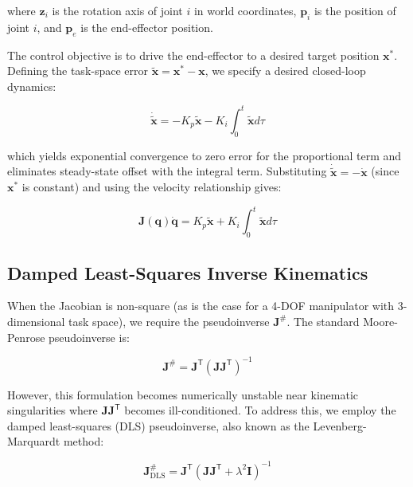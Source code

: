 ﻿\documentclass[12pt,a4paper,oneside]{report}
\begin{document}
where $\mathbf{z}_i$ is the rotation axis of joint $i$ in world coordinates, $\mathbf{p}_i$ is the position of joint $i$, and $\mathbf{p}_e$ is the end-effector position.

The control objective is to drive the end-effector to a desired target position $\mathbf{x}^*$. Defining the task-space error $\tilde{\mathbf{x}} = \mathbf{x}^* - \mathbf{x}$, we specify a desired closed-loop dynamics:

\begin{equation}
\dot{\tilde{\mathbf{x}}} = -K_p \tilde{\mathbf{x}} - K_i \int_0^t \tilde{\mathbf{x}} d\tau
\end{equation}

which yields exponential convergence to zero error for the proportional term and eliminates steady-state offset with the integral term. Substituting $\dot{\tilde{\mathbf{x}}} = -\dot{\mathbf{x}}$ (since $\mathbf{x}^*$ is constant) and using the velocity relationship gives:

\begin{equation}
\mathbf{J}(\mathbf{q}) \dot{\mathbf{q}} = K_p \tilde{\mathbf{x}} + K_i \int_0^t \tilde{\mathbf{x}} d\tau
\end{equation}

\subsection{Damped Least-Squares Inverse Kinematics}

When the Jacobian is non-square (as is the case for a 4-DOF manipulator with 3-dimensional task space), we require the pseudoinverse $\mathbf{J}^{\#}$. The standard Moore-Penrose pseudoinverse is:

\begin{equation}
\mathbf{J}^{\#} = \mathbf{J}^{\mathsf{T}} (\mathbf{J} \mathbf{J}^{\mathsf{T}})^{-1}
\end{equation}

However, this formulation becomes numerically unstable near kinematic singularities where $\mathbf{J} \mathbf{J}^{\mathsf{T}}$ becomes ill-conditioned. To address this, we employ the damped least-squares (DLS) pseudoinverse, also known as the Levenberg-Marquardt method:

\begin{equation}
\mathbf{J}^{\#}_{\text{DLS}} = \mathbf{J}^{\mathsf{T}} (\mathbf{J} \mathbf{J}^{\mathsf{T}} + \lambda^2 \mathbf{I})^{-1}
\end{equation}
\end{document}
